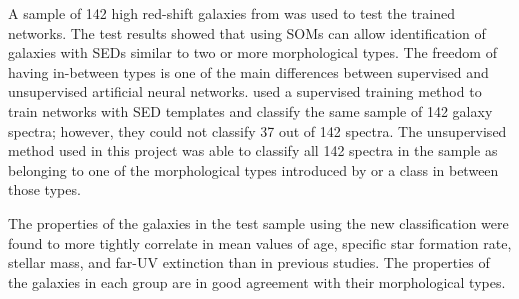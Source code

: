 A sample of 142 high red-shift galaxies from  was used to test the trained networks.
The test results showed that using SOMs can allow identification of galaxies with SEDs similar to two or more morphological types.%
The freedom of having in-between types is one of the main differences between supervised and unsupervised artificial neural networks.
 used a supervised training method to train networks with  SED templates and classify the same sample of 142 galaxy spectra;
however, they could not classify 37 out of 142 spectra.
The unsupervised method used in this project was able to classify  all 142 spectra in the sample
as belonging to one of the morphological types introduced by  or a class in between those types.

The properties of the galaxies in the test sample using the new
classification were found to more tightly correlate in mean values of age, specific star formation rate, stellar mass, and far-UV extinction than in previous studies. 
The properties of the galaxies in each group are in good agreement with their morphological types.